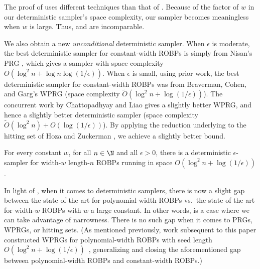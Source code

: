 \documentclass{toc}
\begin{document}
The proof of  uses different techniques than that of . Because of the factor of $w$ in our deterministic sampler's space complexity, our sampler becomes meaningless when $w$ is large. Thus,  and  are incomparable.

We also obtain a new \emph{unconditional} deterministic sampler. When $\epsilon$ is moderate, the best deterministic sampler for constant-width ROBPs is simply from Nisan's PRG \cite{Nis92}, which gives a sampler with space complexity $O(\log^2 n + \log n \log(1/\epsilon))$. When $\epsilon$ is small, using prior work, the best deterministic sampler for constant-width ROBPs was from Braverman, Cohen, and Garg's WPRG \cite{BCG20} (space complexity $\widetilde{O}(\log^2 n + \log(1/\epsilon))$). The concurrent work by Chattopadhyay and Liao \cite{CL20} gives a slightly better WPRG, and hence a slightly better deterministic sampler (space complexity $\widetilde{O}(\log^2 n) + O(\log(1/\epsilon))$). By applying the reduction underlying  to the hitting set of Hoza and Zuckerman \cite{HZ20}, we achieve a slightly better bound.

\begin{theorem} \label{thm:hz-sampler}
For every constant $w$, for all $n \in \N$ and all $\epsilon > 0$, there is a deterministic $\epsilon$-sampler for width-$w$ length-$n$ ROBPs running in space $O(\log^2 n + \log(1/\epsilon))$.
\end{theorem}

In light of , when it comes to deterministic samplers, there is now a slight gap between the state of the art for polynomial-width ROBPs vs.\ the state of the art for width-$w$ ROBPs with $w$ a large constant. In other words,  is a case where we can take advantage of narrowness. There is no such gap when it comes to PRGs, WPRGs, or hitting sets. (As mentioned previously, work subsequent to this paper constructed WPRGs for polynomial-width ROBPs with seed length $O(\log^2 n + \log(1/\epsilon))$~\cite{CDRSTS21,PV21,Hoz21}, generalizing  and closing the aforementioned gap between polynomial-width ROBPs and constant-width ROBPs.)
\end{document}
